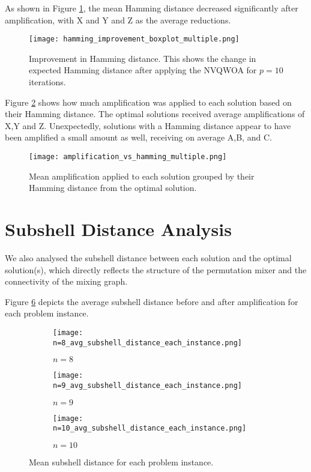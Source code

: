 As shown in Figure \ref{fig:ham improvement}, the mean Hamming distance decreased significantly after amplification, with X and Y and Z as the average reductions.
\begin{figure}[htbp]
    \centering
    \texttt{[image: hamming\_improvement\_boxplot\_multiple.png]}
    \caption{Improvement in Hamming distance. This shows the change in expected Hamming distance after applying the NVQWOA for $p=10$ iterations.}
    \label{fig:ham improvement}
\end{figure}

Figure \ref{fig:amp vs ham} shows how much amplification was applied to each solution based on their Hamming distance. The optimal solutions received average amplifications of X,Y and Z. Unexpectedly, solutions with a Hamming distance appear to have been amplified a small amount as well, receiving on average A,B, and C.
\begin{figure}[htbp]
    \centering
    \texttt{[image: amplification\_vs\_hamming\_multiple.png]}
    \caption{Mean amplification applied to each solution grouped by their Hamming distance from the optimal solution.}
    \label{fig:amp vs ham}
\end{figure}



\section{Subshell Distance Analysis}
We also analysed the subshell distance between each solution and the optimal solution(s), which directly reflects the structure of the permutation mixer and the connectivity of the mixing graph.

Figure \ref{fig:avg sub} depicts the average subshell distance before and after amplification for each problem instance.
\begin{figure}[htbp]
     \centering
     \begin{subfigure}{0.45\textwidth}
         \centering
         \texttt{[image: n=8\_avg\_subshell\_distance\_each\_instance.png]}
         \caption{$n=8$}
         \label{fig:avg sub 8}
     \end{subfigure}
     \hfill
     \begin{subfigure}{0.45\textwidth}
         \centering
         \texttt{[image: n=9\_avg\_subshell\_distance\_each\_instance.png]}
         \caption{$n=9$}
         \label{fig:avg sub 9}
     \end{subfigure}
     \hfill
     \begin{subfigure}{\textwidth}
         \centering
         \texttt{[image: n=10\_avg\_subshell\_distance\_each\_instance.png]}
         \caption{$n=10$}
         \label{fig:avg sub 10}
     \end{subfigure}
        \caption{Mean subshell distance for each problem instance.}
        \label{fig:avg sub}
\end{figure}

